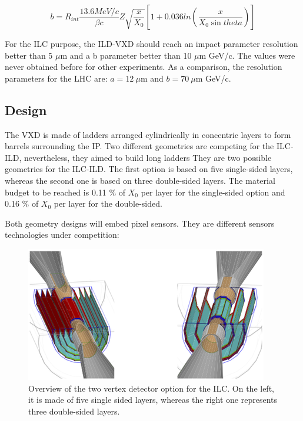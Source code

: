     \begin{equation}
      b = R_{int} \frac{13.6 MeV/c}{\beta c}  Z \sqrt{\frac{x}{X_{0}}} \left[ 1 + 0.036 ln \left( \frac{x}{X_{0}\sin{theta}} \right) \right]
    \end{equation}
   
   For the \gls{ILC} purpose, the \gls{ILD}-\gls{VXD} should reach an impact parameter resolution better than 5 $\mu$m and a b parameter better than 10 $\mu$m GeV/c. 
   The values were never obtained before for other experiments. 
   As a comparison, the resolution parameters for the \gls{LHC} are: $a =  12 \ \mu$m and $b = 70 \ \mu$m GeV/c. 

   \subsection{Design}

   The \gls{VXD} is made of ladders arranged cylindrically in concentric layers to form barrels surrounding the \gls{IP}.
   Two different geometries are competing for the \gls{ILC}-{ILD}, nevertheless, they aimed to build long ladders 
   They are two possible geometries for the \gls{ILC}-{ILD}.
   The first option is based on five single-sided layers, whereas the second one is based on three double-sided layers.
   The material budget to be reached is 0.11 \% of $X_0$ per layer for the single-sided option and 0.16 \% of $X_0$ per layer for the double-sided.
   
   Both geometry designs will embed pixel sensors.
   They are different sensors technologies under competition:

   \begin{figure}[!h]
     \centering
     \includegraphics[width = 10 cm]{Pictures/vxd/ild_VXD.png}
     \caption{Overview of the two vertex detector option for the ILC. On the left, it is made of five single sided layers, whereas the right one represents three double-sided layers.}
   \end{figure}
   
